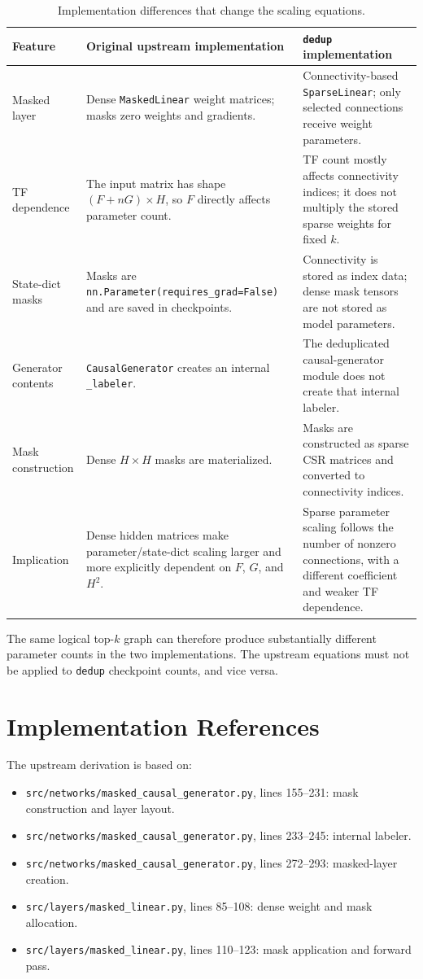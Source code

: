 \documentclass[11pt]{article}
\begin{document}
\begin{table}[H]
\centering
\caption{Implementation differences that change the scaling equations.}
\begin{tabular}{p{}p{}p{}}
\toprule
Feature & Original upstream implementation & \texttt{dedup} implementation \\
\midrule
Masked layer & Dense \texttt{MaskedLinear} weight matrices; masks zero weights and gradients. & Connectivity-based \texttt{SparseLinear}; only selected connections receive weight parameters. \\
TF dependence & The input matrix has shape $(F+nG)\times H$, so $F$ directly affects parameter count. & TF count mostly affects connectivity indices; it does not multiply the stored sparse weights for fixed $k$. \\
State-dict masks & Masks are \texttt{nn.Parameter(requires\_grad=False)} and are saved in checkpoints. & Connectivity is stored as index data; dense mask tensors are not stored as model parameters. \\
Generator contents & \texttt{CausalGenerator} creates an internal \texttt{\_labeler}. & The deduplicated causal-generator module does not create that internal labeler. \\
Mask construction & Dense $H\times H$ masks are materialized. & Masks are constructed as sparse CSR matrices and converted to connectivity indices. \\
Implication & Dense hidden matrices make parameter/state-dict scaling larger and more explicitly dependent on $F$, $G$, and $H^2$. & Sparse parameter scaling follows the number of nonzero connections, with a different coefficient and weaker TF dependence. \\
\bottomrule
\end{tabular}
\end{table}

The same logical top-$k$ graph can therefore produce substantially different parameter counts in
the two implementations. The upstream equations must not be applied to \texttt{dedup} checkpoint
counts, and vice versa.

\section{Implementation References}

The upstream derivation is based on:

\begin{itemize}
\item \texttt{src/networks/masked\_causal\_generator.py}, lines 155--231: mask construction and layer layout.
\item \texttt{src/networks/masked\_causal\_generator.py}, lines 233--245: internal labeler.
\item \texttt{src/networks/masked\_causal\_generator.py}, lines 272--293: masked-layer creation.
\item \texttt{src/layers/masked\_linear.py}, lines 85--108: dense weight and mask allocation.
\item \texttt{src/layers/masked\_linear.py}, lines 110--123: mask application and forward pass.
\end{itemize}
\end{document}
